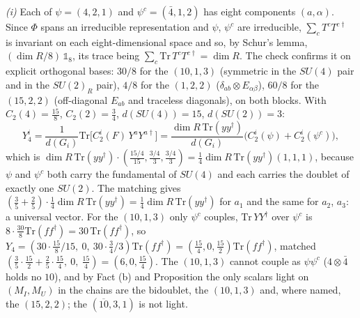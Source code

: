 \emph{(i)} Each of $\psi = (4,2,1)$ and $\psi^{c} = (\bar4,1,2)$ has eight components $(a, \alpha)$. Since $\Phi$ spans an irreducible representation and $\psi$, $\psi^{c}$ are irreducible, $\sum_{c}T^{c}T^{c\dagger}$ is invariant on each eight-dimensional space and so, by Schur's lemma, $(\dim R/8)\,\mathbb{1}_{8}$, its trace being $\sum_{c}\mathrm{Tr}\,T^{c}T^{c\dagger} = \dim R$. The check confirms it on explicit orthogonal bases: $30/8$ for the $(10,1,3)$ (symmetric in the $SU(4)$ pair and in the $SU(2)_{R}$ pair), $4/8$ for the $(1,2,2)$ ($\delta_{ab}\otimes E_{\alpha\beta}$), $60/8$ for the $(15,2,2)$ (off-diagonal $E_{ab}$ and traceless diagonals), on both blocks. With $C_{2}(4) = \tfrac{15}{8}$, $C_{2}(2) = \tfrac34$, $d(SU(4)) = 15$, $d(SU(2)) = 3$:
\[
Y_{4}^{i} = \frac{1}{d(G_{i})}\mathrm{Tr}\bigl[C_{2}^{i}(F)\,Y^{a}Y^{a\dagger}\bigr] = \frac{\dim R\,\mathrm{Tr}(yy^{\dagger})}{d(G_{i})}\bigl(C_{2}^{i}(\psi) + C_{2}^{i}(\psi^{c})\bigr),
\]
which is $\dim R\,\mathrm{Tr}(yy^{\dagger})\cdot(\tfrac{15/4}{15}, \tfrac{3/4}{3}, \tfrac{3/4}{3}) = \tfrac14\dim R\,\mathrm{Tr}(yy^{\dagger})(1,1,1)$, because $\psi$ and $\psi^{c}$ both carry the fundamental of $SU(4)$ and each carries the doublet of exactly one $SU(2)$. The matching gives $(\tfrac35 + \tfrac25)\cdot\tfrac14\dim R\,\mathrm{Tr}(yy^{\dagger}) = \tfrac14\dim R\,\mathrm{Tr}(yy^{\dagger})$ for $a_{1}$ and the same for $a_{2}$, $a_{3}$: a universal vector. For the $(10,1,3)$ only $\psi^{c}$ couples, $\mathrm{Tr}\,YY^{\dagger}$ over $\psi^{c}$ is $8\cdot\tfrac{30}{8}\mathrm{Tr}(ff^{\dagger}) = 30\,\mathrm{Tr}(ff^{\dagger})$, so $Y_{4} = (30\cdot\tfrac{15}{8}/15,\ 0,\ 30\cdot\tfrac34/3)\mathrm{Tr}(ff^{\dagger}) = (\tfrac{15}{4}, 0, \tfrac{15}{2})\mathrm{Tr}(ff^{\dagger})$, matched $(\tfrac35\cdot\tfrac{15}{2} + \tfrac25\cdot\tfrac{15}{4},\ 0,\ \tfrac{15}{4}) = (6, 0, \tfrac{15}{4})$. The $(10,1,3)$ cannot couple as $\psi\psi^{c}$ ($4\otimes\bar4$ holds no $10$), and by Fact (b) and Proposition  the only scalars light on $(M_{I}, M_{U})$ in the chains are the bidoublet, the $(10,1,3)$ and, where named, the $(15,2,2)$; the $(\overline{10},3,1)$ is not light.

